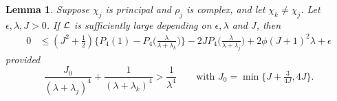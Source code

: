 \documentclass[12pt,psamsfonts]{amsart}
\newtheorem{lem}[thm]{Lemma}
\theoremstyle{definition}
\theoremstyle{remark}
\numberwithin{equation}{section}
\begin{document}
\begin{lem} \label{CC-L1L2Identity-0} Suppose $\chi_j$ is principal and $\rho_j$ is complex, and let $\chi_k \neq \chi_j$. Let  $\epsilon, \lambda, J  > 0$.  If $\mathcal{L}$ is sufficiently large depending on $\epsilon, \lambda$ and $J$, then 
\begin{align*}
0 & \leq (J^2 + \tfrac{1}{2}) \big\{ P_4(1) - P_4\big( \frac{\lambda}{\lambda+\lambda_k} \big) \big\} - 2J P_4\big( \frac{\lambda}{\lambda+\lambda_j} \big) +  2\phi (J+1)^2 \lambda    + \epsilon
\end{align*}
provided 
\begin{equation}
\frac{J_0}{(\lambda+\lambda_j)^4} + \frac{1}{(\lambda+\lambda_k)^4} > \frac{1}{ \lambda^4} \qquad \text{with $J_0 = \min\{ J + \tfrac{3}{4J}, 4J \}$.}
 \label{CC-L1L2-Principal-Condition}
\end{equation}
\end{lem}
\end{document}
